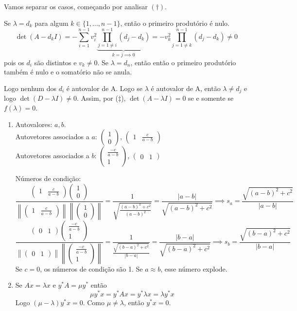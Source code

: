 \documentclass[a4paper,12pt]{article}
\newcommand{\vecea}{\begin{pmatrix} 1 & \frac{c}{a-b} \end{pmatrix}}
\newcommand{\vecda}{\begin{pmatrix} 1 \\ 0 \end{pmatrix}}
\newcommand{\vecdb}{\begin{pmatrix} \frac{-c}{a-b} \\ 1 \end{pmatrix}}
\newcommand{\veceb}{\begin{pmatrix} 0 & 1 \end{pmatrix}}
\begin{document}
Vamos separar os casos, começando por analisar $(\dagger)$. 

Se $\lambda = d_k$ para algum $k \in \{1, \dots, n-1\}$, então o primeiro produtório é nulo.
\[\det(A - d_k I) = -\sum_{i=1}^{n-1}v_i^2 \underbrace{\prod_{j=1 \neq i}^{n-1} (d_j - d_k)}_{k=j\implies 0} = -v_k^2\prod_{j=1 \neq k}^{n-1} (d_j - d_k) \neq 0 \] 
    pois os $d_i$ são distintos e $v_k \neq 0$.
Se $\lambda = d_n$, então então o primeiro produtório  também é nulo e o somatório não se anula. 

Logo nenhum dos $d_i$ é autovalor de A. Logo se $\lambda$ é autovalor de A, então $\lambda \neq d_j$ e logo $\det(D - \lambda I) \neq 0$.  Assim, por ($\ddagger$), $\det(A - \lambda I) = 0$ se e somente se $f(\lambda) = 0$.


\begin{enumerate}
    \item[\textcircled{5}] Autovalores: $a, b$. \\
    Autovetores associados a $a$: $\vecda$, $\vecea$ \\
    Autovetores associados a $b$: $\vecdb$, $\veceb$

    Números de condição:
    \[ 
    \frac{ \vecea \vecda }{\left\|\vecea\right\| \left\|\vecda \right\|} = \frac{1}{\sqrt{\frac{(a-b)^2+c^2}{(a-b)^2}}} = \frac{|a-b|}{\sqrt{(a-b)^2+c^2}} \implies s_a = \frac{\sqrt{(a-b)^2+c^2}}{|a-b|}
    \]
    \[ \frac{\veceb \vecdb}{\left\|\veceb\right\| \left\|\vecdb \right\|}= \frac{1}{\frac{\sqrt{(b-a)^2+c^2}}{|b-a|}} = \frac{|b-a|}{\sqrt{(b-a)^2+c^2}} \implies s_b = \frac{\sqrt{(b-a)^2+c^2}}{|b-a|}
    \]
    Se $c=0$, os números de condição são 1.
    Se $a \approx b$, esse número explode.

    \item[\textcircled{6}] Se $Ax = \lambda x$ e $y^*A = \mu y^*$ então
    \[
    \mu y^*x = y^*Ax = y^*\lambda x = \lambda y^*x
    \]
    Logo $(\mu - \lambda)y^*x = 0$. Como $\mu \neq \lambda$, então $y^*x = 0$.
\end{enumerate}



\end{document}
